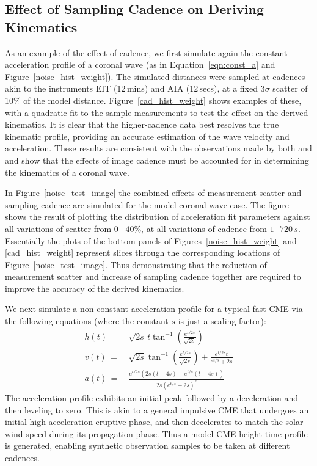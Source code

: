\documentclass[structabstract]{aa}
\begin{document}
\subsection{Effect of Sampling Cadence on Deriving Kinematics}
\label{subsect:cadence}

As an example of the effect of cadence, we first simulate again the constant-acceleration profile of a coronal wave (as in Equation~\ref{eqn:const_a} and Figure~\ref{noise_hist_weight}). The simulated distances were sampled at cadences akin to the instruments EIT (12\,mins) and AIA (12\,secs), at a fixed $3\sigma$ scatter of 10\% of the model distance. Figure~\ref{cad_hist_weight} shows examples of these, with a quadratic fit to the sample measurements to test the effect on the derived kinematics. It is clear that the higher-cadence data best resolves the true kinematic profile, providing an accurate estimation of the wave velocity and acceleration. These results are consistent with the observations made by both \citet{2008ApJ...680L..81L} and \citet{2009ApJ...707..503M} and show that the effects of image cadence must be accounted for in determining the kinematics of a coronal wave.

In Figure~\ref{noise_test_image} the combined effects of measurement scatter and sampling cadence are simulated for the model coronal wave case. The figure shows the result of plotting the distribution of acceleration fit parameters against all variations of scatter from $0$\,--\,$40\%$, at all variations of cadence from $1$\,--$720\,s$. Essentially the plots of the bottom panels of Figures~\ref{noise_hist_weight} and \ref{cad_hist_weight} represent slices through the corresponding locations of Figure~\ref{noise_test_image}. Thus demonstrating that the reduction of measurement scatter and increase of sampling cadence together are required to improve the accuracy of the derived kinematics.

We next simulate a non-constant acceleration profile for a typical fast CME via the following equations (where the constant $s$ is just a scaling factor):
\begin{eqnarray}
h(t)\,=&\,\sqrt{2s}\,t\tan^{-1}\left(\frac{e^{t/2s}}{\sqrt{2s}}\right) \\
v(t)\,=&\,\sqrt{2s}\tan^{-1}\left(\frac{e^{t/2s}}{\sqrt{2s}}\right)+\frac{e^{t/2s}t}{e^{t/s}+2s} \\
a(t)\,=&\,\frac{e^{t/2s}\left(2s\left(t+4s\right)-e^{t/s}\left(t-4s\right)\right)}{2s\left(e^{t/s}+2s\right)^2}
\label{eqn:nonconst_a}
\end{eqnarray}
The acceleration profile exhibits an initial peak followed by a deceleration and then leveling to zero. This is akin to a general impulsive CME that undergoes an initial high-acceleration eruptive phase, and then decelerates to match the solar wind speed during its propagation phase. Thus a model CME height-time profile is generated, enabling synthetic observation samples to be taken at different cadences. 
\end{document}
